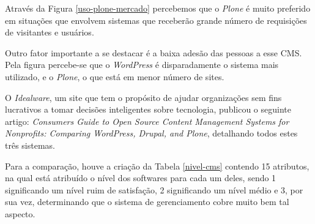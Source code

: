 \newpage

Através da Figura \ref{uso-plone-mercado} percebemos que o \textit{Plone} é muito preferido em situações que envolvem sistemas que receberão grande número de requisições de visitantes e usuários.

Outro fator importante a se destacar é a baixa adesão das pessoas a esse CMS. Pela figura percebe-se que o \textit{WordPress}
é disparadamente o sistema mais utilizado, e o \textit{Plone}, o que está em menor número de sites.

O \textit{Idealware}, um site que tem o propósito de ajudar organizações sem fins lucrativos a tomar decisões inteligentes sobre tecnologia, publicou o seguinte artigo: \textit{Consumers Guide to Open Source Content Management Systems for Nonprofits: Comparing WordPress, Drupal, and Plone}, detalhando todos estes três sistemas.

Para a comparação, houve a criação da Tabela \ref{nivel-cms} contendo 15 atributos, na qual está atribuído o nível dos softwares para cada um deles, sendo 1 significando um nível ruim de satisfação, 2 significando um nível médio e 3, por sua vez, determinando que o sistema de gerenciamento cobre muito bem tal aspecto.

\newpage

